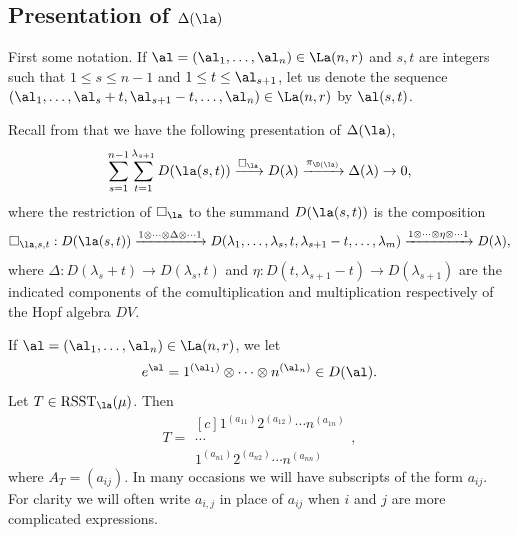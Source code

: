 \subsection{Presentation of \texorpdfstring{$\Delta(\la)$}{Delta(lambda)}}\label{s2.4}
First some notation. If $\al=(\al_1,\dots,\al_n) \in \La(n,r)$ and $s, t$ are integers such that $1 \le s \le n-1$ and $1 \le t \le \al_{s+1} $, let us denote the sequence $(\al_1,\dots,\al_s+t, \al_{s+1}-t,\dots,\al_n) \in \La(n,r)$ by $\al({s,t})$. 

Recall from \cite[Theorem II.3.16]{ABW} that we have the following presentation of $\Delta(\la)$, \begin{equation}\label{pres1}
\sum_{s=1}^{n-1}\sum_{t=1}^{\lambda_{s+1}}D(\la(s,t)) \xrightarrow{\square_{\la}} D(\lambda) \xrightarrow{\pi_{\D(\la)}} \Delta(\lambda) \to 0,\end{equation}
where the restriction of $ \square_{\la} $ to the summand $D(\la(s,t))$ is the composition
\begin{equation}\label{boxmap}
\square_{\la, s,t}:D(\la(s,t)) \xrightarrow{1\otimes\cdots \otimes \Delta \otimes \cdots 1}D(\lambda_1,\dots,\lambda_s,t,\lambda_{s+1}-t,\dots,\lambda_m) \xrightarrow{1\otimes\cdots \otimes \eta \otimes \cdots 1} D(\lambda),
\end{equation}
where $\Delta:D(\lambda_s+t) \to D(\lambda_s,t)$ and $\eta:D(t,\lambda_{s+1}-t) \to D(\lambda_{s+1})$ are the indicated components of the comultiplication and multiplication respectively of the Hopf algebra $DV$. 

If $\al=(\al_1,\dots,\al_n) \in \La(n,r)$, we let \[e^{\al}=1^{(\al_1)} \otimes \cdots \otimes n^{(\al_n)} \in D(\al).\] Let $T \in \mathrm{RSST}_{\la}(\mu)$. Then \[ T=\begin{matrix*}[c]
	1^{(a_{11})}2^{(a_{12})} \cdots n^{(a_{1n})} \\
	\cdots\\
	1^{(a_{n1})} 2^{(a_{n2})}\cdots n^{(a_{nn})}  \end{matrix*}, \]
where $A_T=(a_{ij})$. In many occasions we will have subscripts of the form $a_{ij}$. For clarity we will often write $a_{i,j}$ in place of $a_{ij}$ when $i$ and $j$ are more complicated expressions. 

